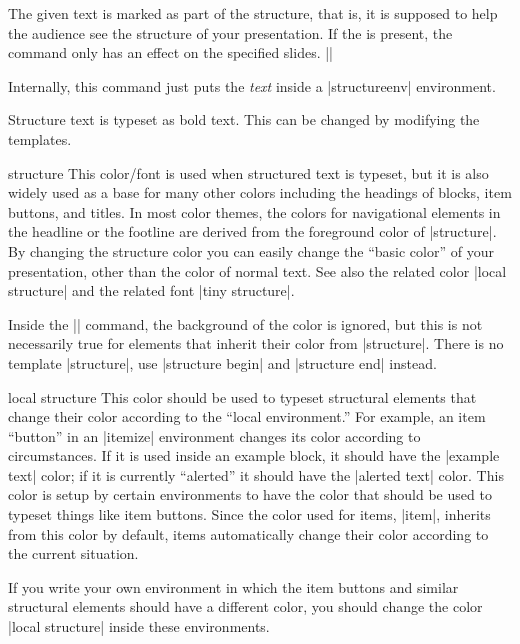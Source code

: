 \begin{command}{\structure{}}
  The given text is marked as part of the structure, that is, it is supposed to help the audience see the structure of your presentation. If the  is present, the command only has an effect on the specified slides.
  \example
  ||

  Internally, this command just puts the \emph{text} inside a |structureenv| environment.

  \articlenote
  Structure text is typeset as bold text. This can be changed by modifying the templates.

  \begin{element}{structure}\no\yes\yes
    This color/font is used when structured text is typeset, but it is also widely used as a base for many other colors including the headings of blocks, item buttons, and titles. In most color themes, the colors for navigational elements in the headline or the footline are derived from the foreground color of |structure|. By changing the structure color you can easily change the ``basic color'' of your presentation, other than the color of normal text. See also the related color |local structure| and the related font |tiny structure|.

    Inside the |\structure| command, the background of the color is ignored, but this is not necessarily true for elements that inherit their color from |structure|. There is no template |structure|, use |structure begin| and |structure end| instead.
  \end{element}

  \begin{element}{local structure}\no\yes\no
    This color should be used to typeset structural elements that change their color according to the ``local environment.'' For example, an item ``button'' in an |itemize| environment changes its color according to circumstances. If it is used inside an example block, it should have the |example text| color; if it is currently ``alerted'' it should have the |alerted text| color. This color is setup by certain environments to have the color that should be used to typeset things like item buttons. Since the color used for items, |item|, inherits from this color by default, items automatically change their color according to the current situation.

    If you write your own environment in which the item buttons and similar structural elements should have a different color, you should change the color |local structure| inside these environments.
  \end{element}


\end{command}
